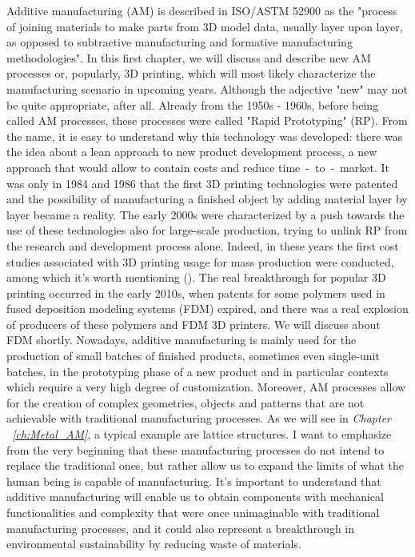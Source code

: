 Additive manufacturing (AM) is described in ISO/ASTM 52900 \cite{international_standard_organization_isoastm_2015} as the "process of joining materials to make parts from 3D model data, usually layer upon layer, as opposed to subtractive manufacturing and formative manufacturing methodologies".
In this first chapter, we will discuss and describe new AM processes or, popularly, 3D printing, which will most likely characterize the manufacturing scenario in upcoming years. Although the adjective "new" may not be quite appropriate, after all. Already from the 1950s - 1960s, before being called AM processes, these processes were called "Rapid Prototyping" (RP). From the name, it is easy to understand why this technology was developed: there was the idea about a lean approach to new product development process, a new approach that would allow to contain costs and reduce time~-~to~-~market. It was only in 1984 and 1986 that the first 3D printing technologies were patented and the possibility of manufacturing a finished object by adding material layer by layer became a reality. The early 2000s were characterized by a push towards the use of these technologies also for large-scale production, trying to unlink RP from the research and development process alone. Indeed, in these years the first cost studies associated with 3D printing usage for mass production were conducted, among which it's worth mentioning \citeauthor{hopkinson_analysis_2003} (\citeyear{hopkinson_analysis_2003}). The real breakthrough for popular 3D printing occurred in the early 2010s, when patents for some polymers used in fused deposition modeling systems (FDM) expired, and there was a real explosion of producers of these polymers and FDM 3D printers. We will discuss about FDM shortly. Nowadays, additive manufacturing is mainly used for the production of small batches of finished products, sometimes even single-unit batches, in the prototyping phase of a new product and in particular contexts which require a very high degree of customization. Moreover, AM processes allow for the creation of complex geometries, objects and patterns that are not achievable with traditional manufacturing processes. As we will see in \textit{Chapter ~\ref{ch:Metal_AM}}, a typical example are lattice structures. 
I want to emphasize from the very beginning that these manufacturing processes do not intend to replace the traditional ones, but rather allow us to expand the limits of what the human being is capable of manufacturing. It's important to understand that additive manufacturing will enable us to obtain components with mechanical functionalities and complexity that were once unimaginable with traditional manufacturing processes, and it could also represent a breakthrough in environmental sustainability by reducing waste of materials.

